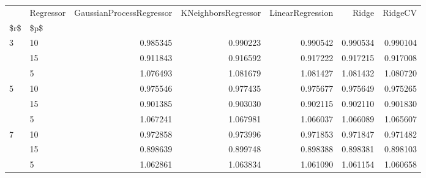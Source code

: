 \begin{tabular}{llrrrrr}
\toprule
  & Regressor &  GaussianProcessRegressor &  KNeighborsRegressor &  LinearRegression &     Ridge &   RidgeCV \\
\$r\$ & \$p\$ &                           &                      &                   &           &           \\
\midrule
3 & 10 &                  0.985345 &             0.990223 &          0.990542 &  0.990534 &  0.990104 \\
  & 15 &                  0.911843 &             0.916592 &          0.917222 &  0.917215 &  0.917008 \\
  & 5 &                  1.076493 &             1.081679 &          1.081427 &  1.081432 &  1.080720 \\
5 & 10 &                  0.975546 &             0.977435 &          0.975677 &  0.975649 &  0.975265 \\
  & 15 &                  0.901385 &             0.903030 &          0.902115 &  0.902110 &  0.901830 \\
  & 5 &                  1.067241 &             1.067981 &          1.066037 &  1.066089 &  1.065607 \\
7 & 10 &                  0.972858 &             0.973996 &          0.971853 &  0.971847 &  0.971482 \\
  & 15 &                  0.898639 &             0.899748 &          0.898388 &  0.898381 &  0.898103 \\
  & 5 &                  1.062861 &             1.063834 &          1.061090 &  1.061154 &  1.060658 \\
\bottomrule
\end{tabular}
